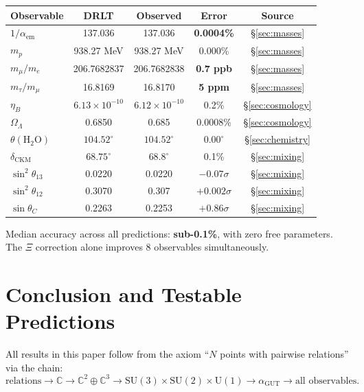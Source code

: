\documentclass[12pt]{article}
\theoremstyle{definition}
\theoremstyle{remark}
\newcommand{\CC}{\mathbb{C}}
\newcommand{\agut}{\alpha_{\mathrm{GUT}}}
\begin{document}
\begin{center}
\begin{tabular}{lcccc}
\toprule
Observable & DRLT & Observed & Error & Source \\
\midrule
$1/\alpha_{\mathrm{em}}$
  & 137.036 & 137.036 & \textbf{0.0004\%}
  & \S\ref{sec:masses} \\
$m_p$ & 938.27 MeV & 938.27 MeV & 0.000\%
  & \S\ref{sec:masses} \\
$m_\mu/m_e$ & 206.7682837 & 206.7682838
  & \textbf{0.7 ppb}
  & \S\ref{sec:masses} \\
$m_\tau/m_\mu$ & 16.8169 & 16.8170
  & \textbf{5 ppm}
  & \S\ref{sec:masses} \\
$\eta_B$ & $6.13 \times 10^{-10}$
  & $6.12 \times 10^{-10}$ & 0.2\%
  & \S\ref{sec:cosmology} \\
$\Omega_\Lambda$ & 0.6850 & 0.685 & 0.0008\%
  & \S\ref{sec:cosmology} \\
$\theta(\mathrm{H_2O})$
  & $104.52^\circ$ & $104.52^\circ$ & $0.00^\circ$
  & \S\ref{sec:chemistry} \\
$\delta_{\mathrm{CKM}}$
  & $68.75^\circ$ & $68.8^\circ$ & 0.1\%
  & \S\ref{sec:mixing} \\
$\sin^2\theta_{13}$
  & 0.0220 & 0.0220 & $-0.07\sigma$
  & \S\ref{sec:mixing} \\
$\sin^2\theta_{12}$
  & 0.3070 & 0.307 & $+0.002\sigma$
  & \S\ref{sec:mixing} \\
$\sin\theta_C$
  & 0.2263 & 0.2253 & $+0.86\sigma$
  & \S\ref{sec:mixing} \\
\bottomrule
\end{tabular}
\end{center}

Median accuracy across all predictions:
\textbf{sub-0.1\%}, with zero free parameters.
The $\Xi$ correction alone improves
8 observables simultaneously.

\section{Conclusion and Testable Predictions}
\label{sec:conclusion}

All results in this paper follow from
the axiom ``$N$ points with pairwise relations''
via the chain:
\begin{equation}
\text{relations}
\to \CC
\to \CC^2 \oplus \CC^3
\to \mathrm{SU}(3) \times \mathrm{SU}(2)
  \times \mathrm{U}(1)
\to \agut
\to \text{all observables}.
\end{equation}
\end{document}

